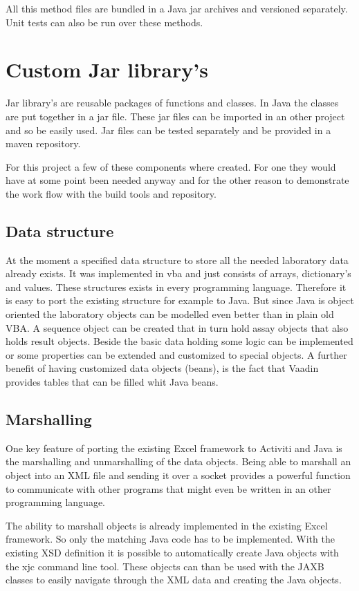 \documentclass[paper=a4,twoside=false,BCOR=0mm,DIV=calc,fontsize=12pt]{scrartcl}
\begin{document}
All this method files are bundled in a Java jar archives and versioned separately. Unit tests can also be run over these methods.


\section{Custom Jar library's}
Jar library's are reusable packages of functions and classes. In Java the classes are put together in a jar file. These jar files can be imported in an other project and so be easily used.
Jar files can be tested separately and be provided in a maven repository.

For this project a few of these components where created. For one they would have at some point been needed anyway and for the other reason to
demonstrate the work flow with the build tools and repository.



\subsection{Data structure}
At the moment a specified data structure to store all the needed laboratory data already exists. It was implemented in vba and just consists of
arrays, dictionary's and values. These structures exists in every programming language. Therefore it is easy to port the existing structure for
example to Java. But since Java is object oriented the laboratory objects can be modelled even better than in plain old VBA. A sequence object can be
created that in turn hold assay objects that also holds result objects. Beside the basic data holding some logic can be implemented or some properties
can be extended and customized to special objects. A further benefit of having customized data objects (beans), is the fact that Vaadin provides
tables that can be filled whit Java beans.




\subsection{Marshalling}
One key feature of porting the existing Excel framework to Activiti and Java is the marshalling and unmarshalling of the data objects.
Being able to marshall an object into an XML file and sending it over a socket provides a powerful function to communicate with other programs that
might even be written in an other programming language.

The ability to marshall objects is already implemented in the existing Excel framework. So only the matching Java code has to be implemented.
With the existing XSD definition it is possible to automatically create Java objects with the xjc \cite{xjc} command line tool.
These objects can than be used with the JAXB \cite{jaxb} classes to easily navigate through the XML data and creating the Java objects.
\end{document}
